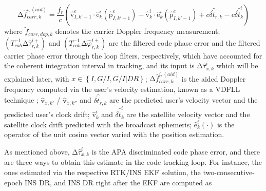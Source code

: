 \documentclass{article}
\begin{document}
\begin{equation}\label{GrindEQ__11_}
\mathrm{\Delta }{\hat{f}}^{i,\left(aid\right)}_{carr,k}\mathrm{=}\frac{f_r}{c}\left({\hat{\boldsymbol{\mathrm{v}}}}^e_{I,k'-1}\cdot {\hat{\boldsymbol{\mathrm{e}}}}^i_k\left({\hat{\boldsymbol{\mathrm{p}}}}^e_{I,k'-1}\right)-{\hat{\boldsymbol{\mathrm{v}}}}^i_k\cdot {\hat{\boldsymbol{\mathrm{e}}}}^i_k\left({\hat{\boldsymbol{\mathrm{p}}}}^e_{I,k'-1}\right)+c\delta {\hat{\dot{t}}}_{r,k}-c\delta {\hat{\dot{t}}}^i_k\right)
\end{equation}
where ${\tilde{f}}_{carr,dop,k}$ denotes the carrier Doppler frequency measurement; $\left(T^{-1}_{coh}\mathrm{\Delta }{\hat{\tau }}^{i+}_{r,k}\right)$ and $\left(T^{-1}_{coh}\mathrm{\Delta }{\hat{\varphi }}^{i+}_{r,k}\right)$ are the filtered code phase error and the filtered carrier phase error through the loop filters, respectively, which have accounted for the coherent integration interval in tracking, and its input is $\mathrm{\Delta }{\hat{\tau }}^i_{x,k}$ which will be explained later, with $x\in \left\{I,G/I,G/I|DR\right\}$; $\mathrm{\Delta }{\hat{f}}^{i,\left(aid\right)}_{carr,k}$ is the aided Doppler frequency computed via the user's velocity estimation, known as a VDFLL technique \cite{Lashley2021}; ${\hat{\boldsymbol{\mathrm{v}}}}_{x,k'}$ / ${\hat{\boldsymbol{\mathrm{v}}}}_{x,k''}$ and $\delta {\hat{\dot{t}}}_{r,k}$ are the predicted user's velocity vector and the predicted user's clock drift; ${\hat{\boldsymbol{\mathrm{v}}}}^i_k$ and $\delta {\hat{\dot{t}}}^i_k$ are the satellite velocity vector and the satellite clock drift predicted with the broadcast ephemeris; ${\hat{\boldsymbol{\mathrm{e}}}}^i_k\left(\cdot \right)$ is the operator of the unit cosine vector varied with the position estimation. 

As mentioned above, $\mathrm{\Delta }{\hat{\tau }}^i_{x,k}$ is the APA discriminated code phase error, and there are three ways to obtain this estimate in the code tracking loop. For instance, the ones estimated via the respective RTK/INS EKF solution, the two-consecutive-epoch INS DR, and INS DR right after the EKF are computed as 
\end{document}
